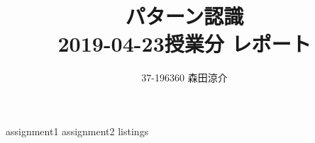 \documentclass[dvipdfmx, fleqn]{jsarticle}
\title{
    パターン認識 \\
    2019-04-23授業分 レポート
    }
\author{37-196360 \quad 森田涼介}
\begin{document}
\maketitle
{assignment1}
\clearpage
{assignment2}
\clearpage
{listings}
\end{document}
